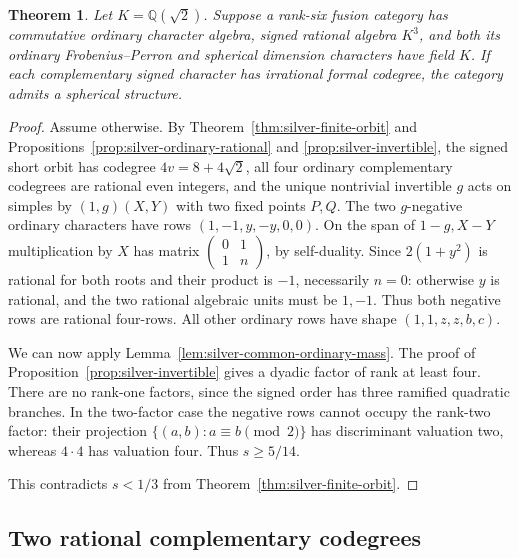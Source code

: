 \documentclass[11pt,reqno]{amsart}
\newtheorem{theorem}{Theorem}[section]
\theoremstyle{remark}\newtheorem{remark}[theorem]{Remark}
\numberwithin{equation}{section}
\begin{document}
\begin{theorem}\label{thm:silver-three-complete}
Let $K=\mathbb Q(\sqrt2)$. Suppose a rank-six fusion category has
commutative ordinary character algebra, signed rational algebra $K^3$,
and both its ordinary Frobenius--Perron and spherical dimension
characters have field $K$. If each complementary signed character
has irrational formal codegree, the category admits a spherical
structure.
\end{theorem}
\begin{proof}
Assume otherwise. By Theorem~\ref{thm:silver-finite-orbit} and
Propositions~\ref{prop:silver-ordinary-rational} and
\ref{prop:silver-invertible}, the signed short orbit has codegree
$4v=8+4\sqrt2$, all four ordinary complementary codegrees are
rational even integers, and the unique nontrivial invertible $g$
acts on simples by $(1,g)(X,Y)$ with two fixed points $P,Q$.
The two $g$-negative ordinary characters have rows
$(1,-1,y,-y,0,0)$. On the span of $1-g,X-Y$ multiplication by
$X$ has matrix $\left(\begin{smallmatrix}0&1\\1&n\end{smallmatrix}\right)$,
by self-duality. Since $2(1+y^2)$ is rational for both roots and
their product is $-1$, necessarily $n=0$: otherwise $y$ is
rational, and the two rational algebraic units must be $1,-1$.
Thus both negative rows are rational four-rows. All other ordinary
rows have shape $(1,1,z,z,b,c)$.

We can now apply Lemma~\ref{lem:silver-common-ordinary-mass}.
The proof of Proposition~\ref{prop:silver-invertible} gives a dyadic
factor of rank at least four. There are no rank-one factors, since
the signed order has three ramified quadratic branches. In the
two-factor case the negative rows cannot occupy the rank-two factor:
their projection $\{(a,b):a\equiv b\pmod2\}$ has discriminant
valuation two, whereas $4\cdot4$ has valuation four. Thus $s\ge5/14$.

This contradicts $s<1/3$ from Theorem~\ref{thm:silver-finite-orbit}.
\end{proof}

\subsection{Two rational complementary codegrees}
\end{document}
